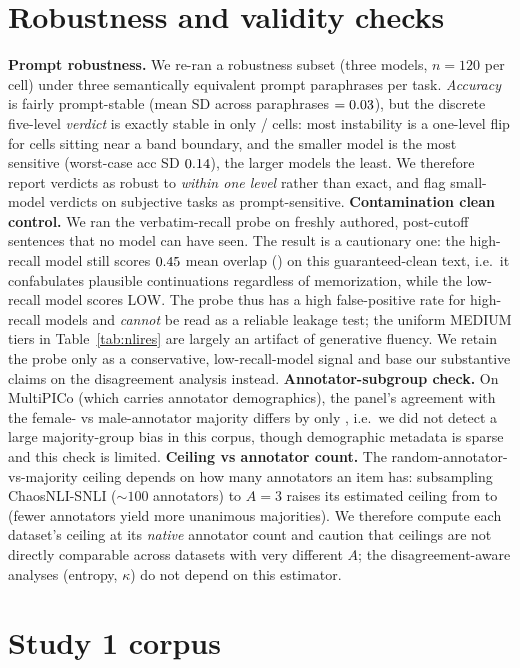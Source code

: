 \section{Robustness and validity checks}\label{app:robust}
\textbf{Prompt robustness.} We re-ran a robustness subset (three models, $n{=}120$ per cell) under
three semantically equivalent prompt paraphrases per task. \emph{Accuracy} is fairly prompt-stable (mean SD across
paraphrases $=0.03$), but the discrete five-level \emph{verdict} is exactly stable in only \PRstable{}/\PRtotal{}
cells: most instability is a one-level flip for cells sitting near a band boundary, and the smaller model is the most
sensitive (worst-case acc SD $0.14$), the larger models the least. We therefore report verdicts as robust to
\emph{within one level} rather than exact, and flag small-model verdicts on subjective tasks as prompt-sensitive.
\textbf{Contamination clean control.} We ran the verbatim-recall probe on freshly authored, post-cutoff sentences
that no model can have seen. The result is a cautionary one: the high-recall model still scores $0.45$ mean
overlap (\CCflag) on this guaranteed-clean text, i.e.\ it confabulates plausible continuations regardless of
memorization, while the low-recall model scores LOW. The probe thus has a high false-positive rate for high-recall
models and \emph{cannot} be read as a reliable leakage test; the uniform MEDIUM tiers in Table~\ref{tab:nlires} are
largely an artifact of generative fluency. We retain the probe only as a conservative, low-recall-model signal and
base our substantive claims on the disagreement analysis instead.
\textbf{Annotator-subgroup check.} On MultiPICo (which carries annotator demographics), the panel's agreement with
the female- vs male-annotator majority differs by only \MPCgenderGap, i.e.\ we did not detect a large majority-group
bias in this corpus, though demographic metadata is sparse and this check is limited.
\textbf{Ceiling vs annotator count.} The random-annotator-vs-majority ceiling depends on how many annotators an item
has: subsampling ChaosNLI-SNLI (${\sim}100$ annotators) to $A{=}3$ raises its estimated ceiling from
\RTwoablCeilFull{} to \RTwoablCeilThree{} (fewer annotators yield more unanimous majorities). We therefore compute
each dataset's ceiling at its \emph{native} annotator count and caution that ceilings are not directly comparable
across datasets with very different $A$; the disagreement-aware analyses (entropy, $\kappa$) do not depend on this
estimator.

\section{Study 1 corpus}\label{app:s1}
{\footnotesize}

